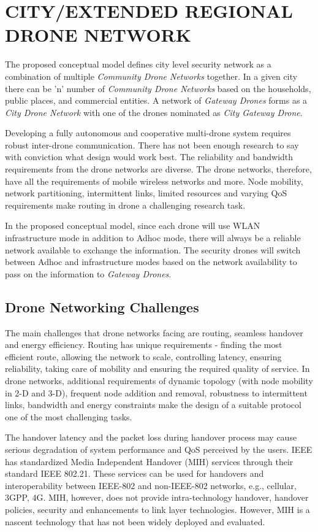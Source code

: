 \documentclass[sigconf]{acmart}
\begin{document}
\section{CITY/EXTENDED REGIONAL DRONE NETWORK}
The proposed conceptual model defines city level security network as a combination of multiple \textit{Community Drone Networks} together. In a given city there can be 'n' number of \textit{Community Drone Networks} based on the households, public places, and commercial entities. A network of \textit{Gateway Drones} forms as a \textit{City Drone Network} with one of the drones nominated as \textit{City Gateway Drone}.

Developing a fully autonomous and cooperative multi-drone system requires robust inter-drone communication. There has not been enough research to say with conviction what design would work best. The reliability and bandwidth requirements from the drone networks are diverse. The drone networks, therefore, have all the requirements of mobile wireless networks and more. Node mobility, network partitioning, intermittent links, limited resources and varying QoS requirements make routing in drone a challenging research task\cite{Gupta2015}. 

In the proposed conceptual model, since each drone will use WLAN infrastructure mode in addition to Adhoc mode, there will always be a reliable network available to exchange the information. The security drones will switch between Adhoc and infrastructure modes based on the network availability to pass on the information to \textit{Gateway Drones}. 

\subsection{Drone Networking Challenges}
The main challenges that drone networks facing are routing, seamless handover and energy efficiency. 
Routing has unique requirements - finding the most efficient route, allowing the network to scale, controlling latency, ensuring reliability, taking care of mobility and ensuring the required quality of service. In drone networks, additional requirements of dynamic topology (with node mobility in 2-D and 3-D), frequent node addition and removal, robustness to intermittent links, bandwidth and energy constraints make the design of a suitable protocol one of the most challenging tasks\cite{Gupta2015}. 

The handover latency and the packet loss during handover process may cause serious degradation of system performance and QoS perceived by the users. IEEE has standardized Media Independent Handover (MIH) services through their standard IEEE 802.21. These services can be used for handovers and interoperability between IEEE-802 and non-IEEE-802 networks, e.g., cellular, 3GPP, 4G. MIH, however, does not provide intra-technology handover, handover policies, security and enhancements to link layer technologies. However, MIH is a nascent technology that has not been widely deployed and evaluated\cite{Gupta2015}.
\end{document}
